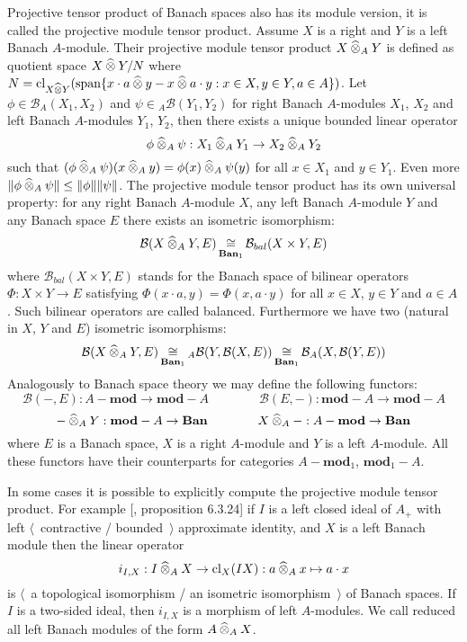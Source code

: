 Projective tensor product of Banach spaces also has its module version, it is
called the projective module tensor product. Assume $X$ is a right and $Y$ is a
left Banach $A$-module. Their projective module tensor product
$X\mathbin{\widehat{\otimes}}_{A}Y$ is defined as quotient space $X\mathbin{\widehat{\otimes}} Y / N$ where
$N
=\operatorname{cl}_{X\mathbin{\widehat{\otimes}} Y}(\operatorname{span} \{
  x\cdot a\mathbin{\widehat{\otimes}} y-x\mathbin{\widehat{\otimes}} a\cdot y
  :x\in X,y\in Y,a\in A
 \})$. 
Let $\phi\in\mathcal{B}_A(X_1,X_2)$ and $\psi\in{}_A\mathcal{B}(Y_1,Y_2)$ 
for right Banach $A$-modules $X_1$, $X_2$ and left 
Banach $A$-modules $Y_1$, $Y_2$, then there exists a unique bounded 
linear operator 
$$
\phi\mathbin{\widehat{\otimes}}_{A} \psi:X_1\mathbin{\widehat{\otimes}}_{A} Y_1\to X_2\mathbin{\widehat{\otimes}}_{A} Y_2
$$ 
such that
$(\phi\mathbin{\widehat{\otimes}}_{A} \psi)(x\mathbin{\widehat{\otimes}}_{A} y)=\phi(x)\mathbin{\widehat{\otimes}}_{A} \psi(y)$
for all $x\in X_1$ and $y\in Y_1$. Even more 
$\Vert \phi\mathbin{\widehat{\otimes}}_{A} \psi\Vert\leq\Vert \phi\Vert\Vert \psi\Vert$. 
The projective module tensor product has its own universal property: for any
right Banach $A$-module $X$, any left Banach $A$-module $Y$ and any Banach space
$E$ there exists an isometric isomorphism:
$$
\mathcal{B}(X\mathbin{\widehat{\otimes}}_{A}Y,E)
\mathop{\mathbin{\cong}}\limits_{\mathbf{Ban}_1}
\mathcal{B}_{bal}(X\times Y, E)
$$
where $\mathcal{B}_{bal}(X\times Y, E)$ stands for the Banach space of bilinear
operators $\Phi:X\times Y\to E$ satisfying $\Phi(x\cdot a,y)=\Phi(x,a\cdot y)$
for all $x\in X$, $y\in Y$ and $a\in A$. Such bilinear operators are called
balanced. Furthermore we have two (natural in $X$, $Y$ and $E$) isometric
isomorphisms:
$$
\mathcal{B}(X\mathbin{\widehat{\otimes}}_{A}Y,E)
\mathop{\mathbin{\cong}}\limits_{\mathbf{Ban}_1}
{}_A\mathcal{B}(Y,\mathcal{B}(X,E))
\mathop{\mathbin{\cong}}\limits_{\mathbf{Ban}_1}
\mathcal{B}_A(X,\mathcal{B}(Y,E))
$$
Analogously to Banach space theory we may define the following functors:
$$
\mathcal{B}(-,E):A-\mathbf{mod}\to \mathbf{mod}-A
\qquad\qquad
\mathcal{B}(E,-):\mathbf{mod}-A\to \mathbf{mod}-A
$$
$$
-\mathbin{\widehat{\otimes}}_{A} Y:\mathbf{mod}-A\to\mathbf{Ban}
\qquad\qquad
X\mathbin{\widehat{\otimes}}_{A} -:A-\mathbf{mod}\to\mathbf{Ban}
$$
where $E$ is a Banach space, $X$ is a right $A$-module and $Y$ is a left
$A$-module. All these functors have their counterparts for categories
$A-\mathbf{mod}_1$, $\mathbf{mod}_1-A$. 

In some cases it is possible to explicitly compute the projective module tensor
product. For example [\cite{HelBanLocConvAlg}, proposition 6.3.24] if $I$ is a
left closed ideal of $A_+$ with left $\langle$~contractive / bounded~$\rangle$
approximate identity, and $X$ is a left Banach module then the linear operator 
$$
i_{I,X}
:I\mathbin{\widehat{\otimes}}_{A}X \to \operatorname{cl}_X(IX)
:a\mathbin{\widehat{\otimes}}_{A} x\mapsto a\cdot x
$$
is $\langle$~a topological isomorphism / an isometric isomorphism~$\rangle$ of
Banach spaces. If $I$ is a two-sided ideal, then $i_{I,X}$ is a morphism of left
$A$-modules. We call reduced all left Banach modules of the form
$A\mathbin{\widehat{\otimes}}_{A}X$. 


